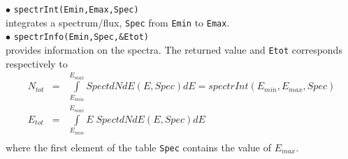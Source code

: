 \documentclass[12pt,a4paper]{article}
\begin{document}
\noindent
$\bullet$ \verb|spectrInt(Emin,Emax,Spec) | \\
integrates a spectrum/flux, \verb|Spec| from {\tt Emin} to  {\tt Emax}.\\
\noindent
$\bullet$ \verb|spectrInfo(Emin,Spec,&Etot)|\\
provides information on the spectra. The  returned value and \verb|Etot| corresponds respectively to   
\begin{eqnarray}
  N_{tot}&=&\int \limits_{E_{min}}^{E_{max}} SpectdNdE(E,Spec) dE = spectrInt(E_{min},E_{max},Spec) \\ 
  E_{tot}&=&  \int \limits_{E_{min}}^{E_{max}} E\; SpectdNdE(E,Spec)dE\\
  \nonumber
 \end{eqnarray}
where the first element of the table {\tt Spec} contains the value of   $E_{max}$.
\end{document}
